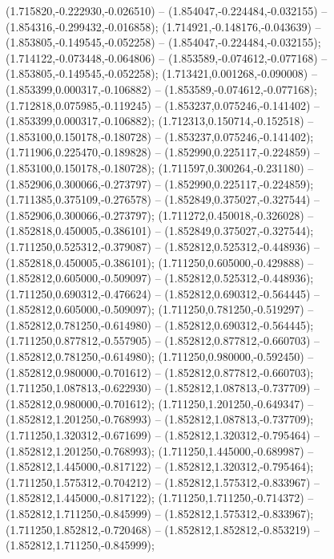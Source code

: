  (1.715820,-0.222930,-0.026510) -- (1.854047,-0.224484,-0.032155) -- (1.854316,-0.299432,-0.016858);
 (1.714921,-0.148176,-0.043639) -- (1.853805,-0.149545,-0.052258) -- (1.854047,-0.224484,-0.032155);
 (1.714122,-0.073448,-0.064806) -- (1.853589,-0.074612,-0.077168) -- (1.853805,-0.149545,-0.052258);
 (1.713421,0.001268,-0.090008) -- (1.853399,0.000317,-0.106882) -- (1.853589,-0.074612,-0.077168);
 (1.712818,0.075985,-0.119245) -- (1.853237,0.075246,-0.141402) -- (1.853399,0.000317,-0.106882);
 (1.712313,0.150714,-0.152518) -- (1.853100,0.150178,-0.180728) -- (1.853237,0.075246,-0.141402);
 (1.711906,0.225470,-0.189828) -- (1.852990,0.225117,-0.224859) -- (1.853100,0.150178,-0.180728);
 (1.711597,0.300264,-0.231180) -- (1.852906,0.300066,-0.273797) -- (1.852990,0.225117,-0.224859);
 (1.711385,0.375109,-0.276578) -- (1.852849,0.375027,-0.327544) -- (1.852906,0.300066,-0.273797);
 (1.711272,0.450018,-0.326028) -- (1.852818,0.450005,-0.386101) -- (1.852849,0.375027,-0.327544);
 (1.711250,0.525312,-0.379087) -- (1.852812,0.525312,-0.448936) -- (1.852818,0.450005,-0.386101);
 (1.711250,0.605000,-0.429888) -- (1.852812,0.605000,-0.509097) -- (1.852812,0.525312,-0.448936);
 (1.711250,0.690312,-0.476624) -- (1.852812,0.690312,-0.564445) -- (1.852812,0.605000,-0.509097);
 (1.711250,0.781250,-0.519297) -- (1.852812,0.781250,-0.614980) -- (1.852812,0.690312,-0.564445);
 (1.711250,0.877812,-0.557905) -- (1.852812,0.877812,-0.660703) -- (1.852812,0.781250,-0.614980);
 (1.711250,0.980000,-0.592450) -- (1.852812,0.980000,-0.701612) -- (1.852812,0.877812,-0.660703);
 (1.711250,1.087813,-0.622930) -- (1.852812,1.087813,-0.737709) -- (1.852812,0.980000,-0.701612);
 (1.711250,1.201250,-0.649347) -- (1.852812,1.201250,-0.768993) -- (1.852812,1.087813,-0.737709);
 (1.711250,1.320312,-0.671699) -- (1.852812,1.320312,-0.795464) -- (1.852812,1.201250,-0.768993);
 (1.711250,1.445000,-0.689987) -- (1.852812,1.445000,-0.817122) -- (1.852812,1.320312,-0.795464);
 (1.711250,1.575312,-0.704212) -- (1.852812,1.575312,-0.833967) -- (1.852812,1.445000,-0.817122);
 (1.711250,1.711250,-0.714372) -- (1.852812,1.711250,-0.845999) -- (1.852812,1.575312,-0.833967);
 (1.711250,1.852812,-0.720468) -- (1.852812,1.852812,-0.853219) -- (1.852812,1.711250,-0.845999);
